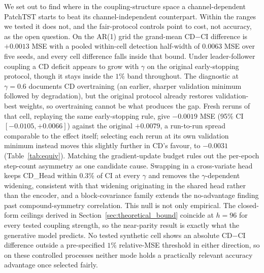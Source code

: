 \documentclass[10pt]{article} %
\begin{document}
    We set out to find where in the coupling-structure space a channel-dependent PatchTST starts to beat its
    channel-independent counterpart. Within the ranges we tested it does not, and the fair-protocol controls point to
    cost, not accuracy, as the open question. On the AR(1) grid the grand-mean CD$-$CI difference is
    $+0.0013$ MSE with a pooled within-cell detection half-width of 0.0063 MSE over five seeds, and every cell
    difference falls inside that bound. Under leader-follower coupling a CD deficit appears to grow with $\gamma$ on
    the original early-stopping protocol, though it stays inside the $1\%$ band throughout. The diagnostic at
    $\gamma = 0.6$ documents CD overtraining (an earlier, sharper validation minimum followed by degradation), but
    the original protocol already restores validation-best weights, so overtraining cannot be what produces the gap. Fresh
    reruns of that cell, replaying the same early-stopping rule, give $-0.0019$ MSE (95\% CI $[-0.0105, +0.0066]$)
    against the original $+0.0079$, a run-to-run spread comparable to the effect itself; selecting each rerun at its
    own validation minimum instead moves this slightly further in CD's favour, to $-0.0031$ (Table~\ref{tab:equiv}).
    Matching the gradient-update budget rules out the per-epoch step-count asymmetry as one candidate cause. Swapping in a
    cross-variate head keeps CD\_Head within 0.3\% of CI at every $\gamma$ and removes the $\gamma$-dependent widening,
    consistent with that widening originating in the shared head rather than the encoder, and a block-covariance family
    extends the no-advantage finding past compound-symmetry correlation. This null is not only empirical. The closed-form
    ceilings derived in Section~\ref{sec:theoretical_bound} coincide at $h=96$ for every tested coupling strength, so the
    near-parity result is exactly what the generative model predicts. No tested synthetic cell shows an absolute CD$-$CI
    difference outside a pre-specified $1\%$ relative-MSE threshold in either direction, so on these controlled processes
    neither mode holds a practically relevant accuracy advantage once selected fairly.
\end{document}
